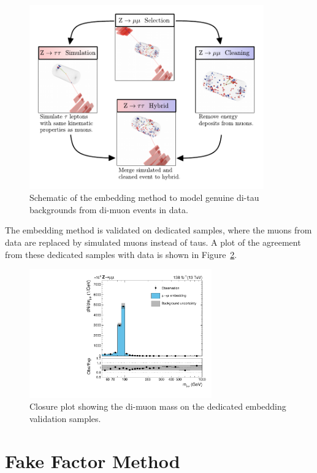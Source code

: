 \begin{figure}[!hbtp]
\centering
    \includegraphics[width=0.9\textwidth]{Figures/Embedding_Diagram.pdf}
\caption{Schematic of the embedding method to model genuine di-tau backgrounds from di-muon events in data.}
\label{fig:embedding}
\end{figure}

The embedding method is validated on dedicated samples, where the muons from data are replaced by simulated muons instead of taus.
A plot of the agreement from these dedicated samples with data is shown in Figure~\ref{fig:emb_validation}.

\begin{figure}[!hbtp]
\centering
    \includegraphics[width=0.7\textwidth]{Figures/embedding_validation.pdf}
\caption{Closure plot showing the di-muon mass on the dedicated embedding validation samples.}
\label{fig:emb_validation}
\end{figure}

\section{Fake Factor Method}
\label{sec:ff}

